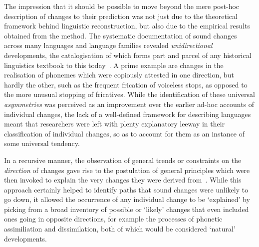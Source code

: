 The impression that it should be possible to move beyond the mere post-hoc description of changes to their prediction was not just due to the theoretical framework behind linguistic reconstruction, but also due to the empirical results obtained from the method. The systematic documentation of sound changes across many languages and language families revealed \emph{unidirectional} developments, the catalogisation of which forms part and parcel of any historical linguistics textbook to this today~\citep[see e.g.][]{Campbell2013}. A prime example are changes in the realisation of phonemes which were copiously attested in one direction, but hardly the other, such as the frequent frication of voiceless stops, as opposed to the more unusual stopping of fricatives. While the identification of these universal \emph{asymmetries} was perceived as an improvement over the earlier ad-hoc accounts of individual changes, the lack of a well-defined framework for describing languages meant that researchers were left with plenty explanatory leeway in their classification of individual changes, so as to account for them as an instance of some universal tendency.

In a recursive manner, the observation of general trends or constraints on the \emph{direction} of changes gave rise to the postulation of general principles which were then invoked to explain the very changes they were derived from~\citep{Lass1980,Haspelmath2006}. While this approach certainly helped to identify paths that sound changes were unlikely %
to go down, it allowed the occurrence of any individual change to be `explained' by picking from a broad inventory of possible or `likely' changes that even included ones going in opposite directions, for example the processes of phonetic assimiliation and dissimilation, both of which would be considered `natural' developments.


